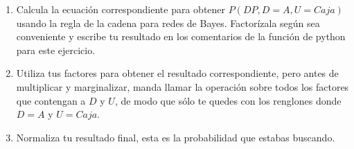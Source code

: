 \begin{enumerate}
 \begin{enumerate}
  \item Calcula la ecuación correspondiente para obtener $P(DP,D=A,U=Caja)$ usando la regla de la cadena para redes de Bayes.  Factorízala según sea conveniente y escribe tu resultado en los comentarios de la función de python para este ejercicio.
  
  \item Utiliza tus factores para obtener el resultado correspondiente, pero antes de multiplicar y marginalizar, manda llamar la operación  sobre todos los factores que contengan a $D$ y $U$, de modo que sólo te quedes con los renglones donde $D=A$ y $U=Caja$.
  
  \item Normaliza tu resultado final, esta es la probabilidad que estabas buscando.
 \end{enumerate}
\end{enumerate}
